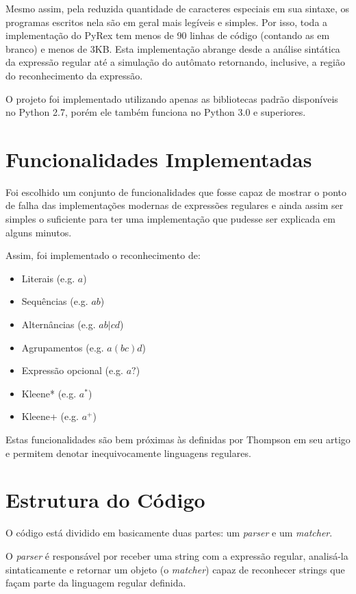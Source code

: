 \documentclass[a4paper,12pt,oneside,onecolumn]{uerj}
\begin{document}
Mesmo assim, pela reduzida quantidade de caracteres especiais em sua sintaxe, os programas escritos nela são em geral mais legíveis e simples. Por isso, toda a implementação do PyRex tem menos de 90 linhas de código (contando as em branco) e menos de 3KB. Esta implementação abrange desde a análise sintática da expressão regular até a simulação do autômato retornando, inclusive, a região do reconhecimento da expressão.

O projeto foi implementado utilizando apenas as bibliotecas padrão disponíveis no Python 2.7, porém ele também funciona no Python 3.0 e superiores.

\section{Funcionalidades Implementadas}

Foi escolhido um conjunto de funcionalidades que fosse capaz de mostrar o ponto de falha das implementações modernas de expressões regulares e ainda assim ser simples o suficiente para ter uma implementação que pudesse ser explicada em alguns minutos.

Assim, foi implementado o reconhecimento de:

\begin{itemize}
    \item Literais (e.g. $a$)
    \item Sequências (e.g. $ab$)
    \item Alternâncias (e.g. $ab|cd$)
    \item Agrupamentos (e.g. $a(bc)d$)
    \item Expressão opcional (e.g. $a?$)
    \item Kleene* (e.g. $a^*$)
    \item Kleene+ (e.g. $a^+$)
\end{itemize}

Estas funcionalidades são bem próximas às definidas por Thompson \cite{bib:Thompson68} em seu artigo e permitem denotar inequivocamente linguagens regulares.

\section{Estrutura do Código}

O código está dividido em basicamente duas partes: um \emph{parser} e um \emph{matcher}.

O \emph{parser} é responsável por receber uma string com a expressão regular, analisá-la sintaticamente e retornar um objeto (o \emph{matcher}) capaz de reconhecer strings que façam parte da linguagem regular definida.
\end{document}
